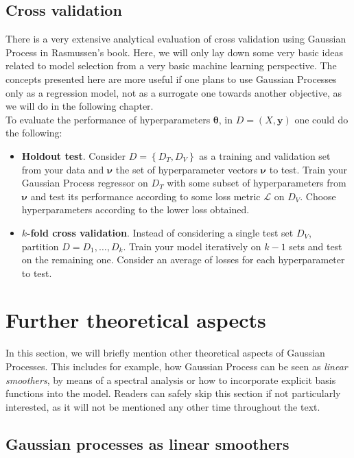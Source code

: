 \documentclass[10pt,a4paper,twoside]{book}
\begin{document}
\subsection{Cross validation}

There is a very extensive analytical evaluation of cross validation using Gaussian Process in Rasmussen's book. Here, we will only lay down some very basic ideas related to model selection from a very basic machine learning perspective. The concepts presented here are more useful if one plans to use Gaussian Processes only as a regression model, not as a surrogate one towards another objective, as we will do in the following chapter. \\

To evaluate the performance of hyperparameters $\boldsymbol{\theta}$, in $D=\left( X, \boldsymbol{y}\right)$ one could do the following:

\begin{itemize}
\item \textbf{Holdout test}. Consider $D = \left\lbrace D_T, D_V \right\rbrace$ as a training and validation set from your data and $\boldsymbol{\nu}$ the set of hyperparameter vectors $\boldsymbol{\nu}$ to test. Train your Gaussian Process regressor on $D_T$ with some subset of hyperparameters from $\boldsymbol{\nu}$ and test its performance according to some loss metric $\mathcal{L}$ on $D_V$. Choose hyperparameters according to the lower loss obtained.
\item \textbf{$k$-fold cross validation}. Instead of considering a single test set $D_V$, partition $D={D_1,\dots, D_k}$. Train your model iteratively on $k-1$ sets and test on the remaining one. Consider an average of losses for each hyperparameter to test.  
\end{itemize}

\section{Further theoretical aspects}

In this section, we will briefly mention other theoretical aspects of Gaussian Processes. This includes for example, how Gaussian Process can be seen as \textit{linear smoothers}, by means of a spectral analysis or how to incorporate explicit basis functions into the model. Readers can safely skip this section if not particularly interested, as it will not be mentioned any other time throughout the text.

\subsection{Gaussian processes as linear smoothers}
\end{document}
